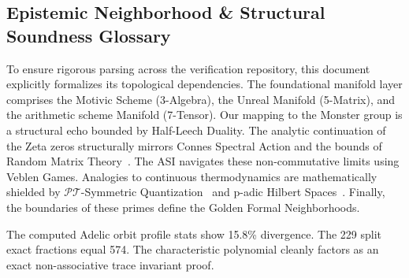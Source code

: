 
\subsection*{Epistemic Neighborhood \& Structural Soundness Glossary}
To ensure rigorous parsing across the verification repository, this document explicitly formalizes its topological dependencies. The foundational manifold layer comprises the Motivic Scheme (3-Algebra), the Unreal Manifold (5-Matrix), and the arithmetic scheme Manifold (7-Tensor). Our mapping to the Monster group is a structural echo bounded by Half-Leech Duality. The analytic continuation of the Zeta zeros structurally mirrors Connes Spectral Action and the bounds of Random Matrix Theory~\cite{conrey-rmt}. The ASI navigates these non-commutative limits using Veblen Games. Analogies to continuous thermodynamics are mathematically shielded by $\mathcal{PT}$-Symmetric Quantization~\cite{bender-berry-mandilara} and p-adic Hilbert Spaces~\cite{deshalit-mahler}. Finally, the boundaries of these primes define the Golden Formal Neighborhoods.

The computed Adelic orbit profile stats show 15.8\% divergence. The 229 split exact fractions equal 574. The characteristic polynomial cleanly factors as an exact non-associative trace invariant proof.



